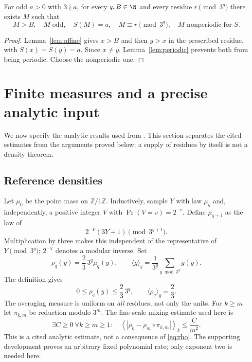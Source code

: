 \begin{theorem}\label{thm:supply}
For odd $a>0$ with $3\nmid a$, for every $q,B\in\N$ and every residue
$r\pmod{3^q}$ there exists $M$ such that
\begin{equation}\label{eq:supply}
 M>B,\quad M\text{ odd},\quad S(M)=a,\quad M\equiv r\pmod{3^q},
 \quad M\text{ nonperiodic for }S.
\end{equation}
\end{theorem}
\begin{proof}
Lemma~\ref{lem:affine} gives $x>B$ and then $y>x$ in the prescribed
residue, with $S(x)=S(y)=a$. Since $x\ne y$, Lemma~\ref{lem:periodic}
prevents both from being periodic. Choose the nonperiodic one.
\end{proof}

\section{Finite measures and a precise analytic input}
We now specify the analytic results used from \cite{mazur-density}.
This section separates the cited estimates from the arguments proved
below; a supply of residues by itself is not a density theorem.

\subsection{Reference densities}
Let $\mu_0$ be the point mass on $\mathbb Z/1\mathbb Z$.
Inductively, sample $Y$ with law $\mu_q$ and, independently, a positive
integer $V$ with $\Pr(V=v)=2^{-v}$. Define $\mu_{q+1}$ as the law of
\begin{equation}\label{eq:pmf}
 2^{-V}(3Y+1)\pmod{3^{q+1}}.
\end{equation}
Multiplication by three makes this independent of the representative
of $Y\pmod{3^q}$; $2^{-V}$ denotes a modular inverse.
Set
\[
 \rho_q(y)=\frac23\,3^q\mu_q(y),\qquad
 \langle g\rangle_q=\frac1{3^q}\sum_{y\bmod3^q}g(y).
\]
The definition gives
\begin{equation}\label{eq:rho}
 0\le\rho_q(y)\le\frac23\,3^q,\qquad
 \langle\rho_q\rangle_q=\frac23.
\end{equation}
The averaging measure is uniform on \emph{all} residues, not only the units.
For $k\ge m$ let $\pi_{k,m}$ be reduction modulo $3^m$.
The fine-scale mixing estimate used here is
\begin{equation}\label{eq:mixing}
 \exists C\ge0\ \forall k\ge m\ge1:\quad
 \left\langle\left|\rho_k-\rho_m\circ\pi_{k,m}\right|\right\rangle_k
 \le\frac{C}{m^2}.
\end{equation}
This is a cited analytic estimate, not a consequence of
\eqref{eq:rho}. The supporting development proves an arbitrary fixed
polynomial rate; only exponent two is needed here.

